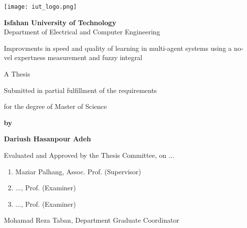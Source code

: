 \thispagestyle{empty}
\begin{latin}
\begin{center}
\texttt{[image: iut\_logo.png]}
\vspace{0.4cm}

{\large\textbf{Isfahan University of Technology}}\\

\vspace{0.4cm}
Department of Electrical and Computer Engineering

\vspace{2.5cm}

{\Huge Improvments in speed and quality of learning in multi-agent systems using a novel expertness measurement and fuzzy integral}

\vspace{1.5cm}

{\large
	A Thesis
	
	\vspace{.3cm}
	
	Submitted in partial fulfillment of the requirements
	
	\vspace{.3cm}
	
	for the degree of Master of Science
}

	\vspace{1.5cm}

{\Large
	\textbf{by}
	
	\vspace{.3cm}
	
	\textbf{Dariush Hasanpour Adeh}
}
\end{center}

\vfill

Evaluated and Approved by the Thesis Committee, on ...
\vspace{0.5cm}

\begin{enumerate}
\item Maziar Palhang, Assoc. Prof. (Supervisor)
\vspace{0.5cm}

\item ..., Prof. (Examiner)
\vspace{0.5cm}

\item ..., Prof. (Examiner)
\vspace{0.5cm}

\end{enumerate}

Mohamad Reza Taban, Department Graduate Coordinator

\pagebreak
\end{latin}

\thispagestyle{empty}
\mbox{}

